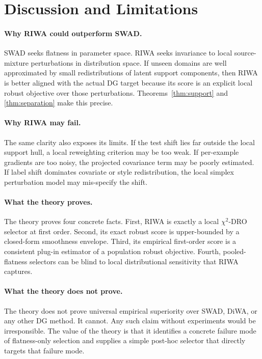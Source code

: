 \documentclass{article}
\newcommand{\riwa}{\textup{\textsc{RIWA}}}
\newcommand{\swad}{\textup{\textsc{SWAD}}}
\begin{document}
\section{Discussion and Limitations}

\paragraph{Why \riwa{} could outperform \swad{}.}
\swad{} seeks flatness in parameter space. \riwa{} seeks invariance to local source-mixture perturbations in distribution space. If unseen domains are well approximated by small redistributions of latent support components, then \riwa{} is better aligned with the actual DG target because its score is an explicit local robust objective over those perturbations. Theorems~\ref{thm:support} and \ref{thm:separation} make this precise.

\paragraph{Why \riwa{} may fail.}
The same clarity also exposes its limits. If the test shift lies far outside the local support hull, a local reweighting criterion may be too weak. If per-example gradients are too noisy, the projected covariance term may be poorly estimated. If label shift dominates covariate or style redistribution, the local simplex perturbation model may mis-specify the shift.

\paragraph{What the theory proves.}
The theory proves four concrete facts. First, \riwa{} is exactly a local $\chi^2$-DRO selector at first order. Second, its exact robust score is upper-bounded by a closed-form smoothness envelope. Third, its empirical first-order score is a consistent plug-in estimator of a population robust objective. Fourth, pooled-flatness selectors can be blind to local distributional sensitivity that \riwa{} captures.

\paragraph{What the theory does not prove.}
The theory does not prove universal empirical superiority over \swad{}, DiWA, or any other DG method. It cannot. Any such claim without experiments would be irresponsible. The value of the theory is that it identifies a concrete failure mode of flatness-only selection and supplies a simple post-hoc selector that directly targets that failure mode.
\end{document}
